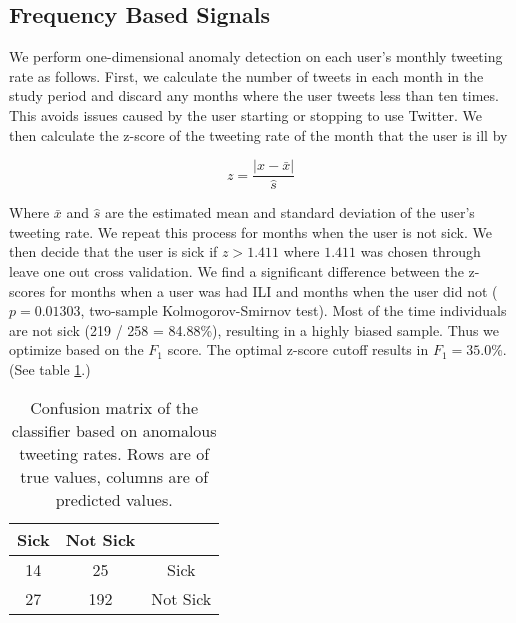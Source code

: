 \documentclass{acm_proc_article-sp}
\begin{document}
\subsection{Frequency Based Signals}

We perform one-dimensional anomaly detection on each user's monthly tweeting rate as follows. First, we calculate the number of tweets in each month in the study period and discard any months where the user tweets less than ten times. This avoids issues caused by the user starting or stopping to use Twitter. We then calculate the z-score of the tweeting rate of the month that the user is ill by

\begin{equation}
z = \frac{|x - \bar{x}|}{\hat{s}}
\end{equation}

Where \(\bar{x}\) and \(\hat{s}\) are the estimated mean and standard deviation of the user's tweeting rate. \cite{Grubs:1969ab} We repeat this process for months when the user is not sick. We then decide that the user is sick if \(z > 1.411\) where \(1.411\) was chosen through leave one out cross validation. We find a significant difference between the z-scores for months when a user was had ILI and months when the user did not (\(p = 0.01303\), two-sample Kolmogorov-Smirnov test). Most of the time individuals are not sick (219 / 258 = 84.88\%), resulting in a highly biased sample. Thus we optimize based on the \(F_1\) score. The optimal z-score cutoff results in \(F_1= 35.0\%\). (See table \ref{tab:tweet_anomaly_confusion}.) 




\begin{table}
\centering
\begin{tabular}{|c|c|c|} \hline
Sick&Not Sick&\ \\ \hline
14 & 25 & Sick\\ \hline
27 & 192 & Not Sick\\
\hline\end{tabular}
\caption{Confusion matrix of the classifier based on anomalous tweeting rates. Rows are of true values, columns are of predicted values.}
\label{tab:tweet_anomaly_confusion}
\end{table}
\end{document}
